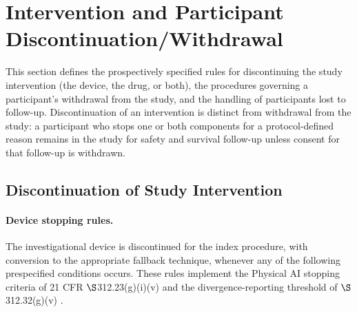 \section{Intervention and Participant Discontinuation/Withdrawal}

This section defines the prospectively specified rules for discontinuing the study
intervention (the device, the drug, or both), the procedures governing a
participant's withdrawal from the study, and the handling of participants lost to
follow-up. Discontinuation of an intervention is distinct from withdrawal from the
study: a participant who stops one or both components for a protocol-defined reason
remains in the study for safety and survival follow-up unless consent for that
follow-up is withdrawn.

\subsection{Discontinuation of Study Intervention}

\paragraph{Device stopping rules.}
The investigational device is discontinued for the index procedure, with conversion
to the appropriate fallback technique, whenever any of the following prespecified
conditions occurs. These rules implement the Physical AI stopping criteria of 21 CFR
$\S$312.23(g)(i)(v) and the divergence-reporting threshold of $\S$312.32(g)(v)
\cite{kawchak2026adapt312}.

